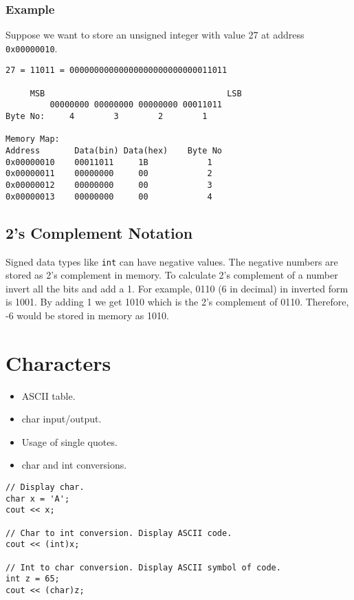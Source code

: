 \documentclass[12pt,a4paper]{article}
\begin{document}
\subsubsection{Example}
Suppose we want to store an unsigned integer with value 27 at address \verb|0x00000010|.

\begin{verbatim}
27 = 11011 = 00000000000000000000000000011011

     MSB                                     LSB
         00000000 00000000 00000000 00011011
Byte No:     4        3        2        1

Memory Map:
Address       Data(bin) Data(hex)    Byte No
0x00000010    00011011     1B            1
0x00000011    00000000     00            2
0x00000012    00000000     00            3
0x00000013    00000000     00            4
\end{verbatim}


\subsection{2's Complement Notation}
Signed data types like \verb|int| can have negative values. The negative numbers are stored as 2's complement in memory. To calculate 2's complement of a number invert all the bits and add a 1. For example, 0110 (6 in decimal) in inverted form is 1001. By adding 1 we get 1010 which is the 2's complement of 0110. Therefore, -6 would be stored in memory as 1010.
\section{Characters}
\begin{itemize}
\item ASCII table.
\item char input/output.
\item Usage of single quotes.
\item char and int conversions.
\end{itemize}
\begin{lstlisting}
// Display char.
char x = 'A';
cout << x;

// Char to int conversion. Display ASCII code.
cout << (int)x;

// Int to char conversion. Display ASCII symbol of code.
int z = 65;
cout << (char)z;
\end{lstlisting}
\end{document}
